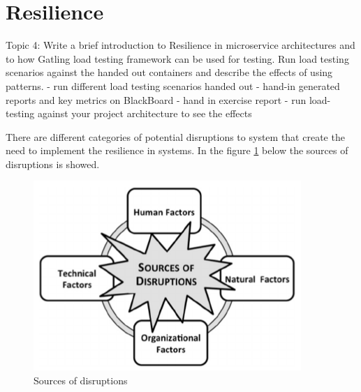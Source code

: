 \chapter{Resilience}\label{ch:resilience}
Topic 4: Write a brief introduction to Resilience in microservice architectures and to how Gatling load testing framework can be used for testing. Run load testing scenarios against the handed out containers and describe the effects of using patterns.
- run different load testing scenarios handed out
- hand-in generated reports and key metrics on BlackBoard 
- hand in exercise report
- run load-testing against your project architecture to see the effects

There are different categories of potential disruptions to system that create the need to implement the resilience in systems. In the figure \ref{ch:resilience} below the sources of disruptions is showed. 

\begin{figure}[bth]
	\includegraphics[width=0.7\linewidth]{gfx/resilience}
	\caption[routingtable]{Sources of disruptions} \label{fig:resilience}
\end{figure}   

